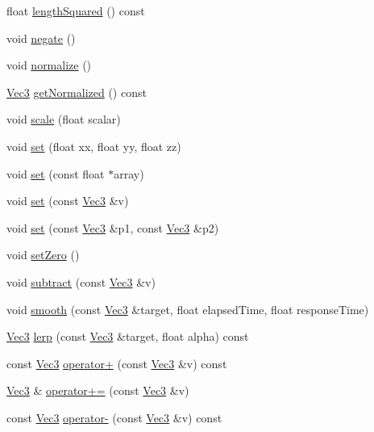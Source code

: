 \begin{DoxyCompactItemize}
\item 
float \hyperlink{classVec3_a31d057d72313ad255d61fb684a37c24f}{length\+Squared} () const
\item 
void \hyperlink{classVec3_aa770b4935cd7d13e1f2571b326e98ac9}{negate} ()
\item 
void \hyperlink{classVec3_a3a6631559d1d36eaf34ca586ce86ede1}{normalize} ()
\item 
\hyperlink{classVec3}{Vec3} \hyperlink{classVec3_aed345a2ae8ac7a2a76aecf07cec2e0af}{get\+Normalized} () const
\item 
void \hyperlink{classVec3_a62541bd2e79923b7da500bfabeb54b4a}{scale} (float scalar)
\item 
void \hyperlink{classVec3_a75e9107e6297aa63a385f6ff3c17742b}{set} (float xx, float yy, float zz)
\item 
void \hyperlink{classVec3_a61237d7bfe731bd96235a3fe7aeaf6e7}{set} (const float $\ast$array)
\item 
void \hyperlink{classVec3_ab3975270b5f296c9397d51c90765e80e}{set} (const \hyperlink{classVec3}{Vec3} \&v)
\item 
void \hyperlink{classVec3_af3cde4c257ab262d2f86c67a5ff0603b}{set} (const \hyperlink{classVec3}{Vec3} \&p1, const \hyperlink{classVec3}{Vec3} \&p2)
\item 
void \hyperlink{classVec3_a8b09dd643a87bc559ebf6aacb73b7f96}{set\+Zero} ()
\item 
void \hyperlink{classVec3_a7c31a8cd8647e4be1e5c82a5f29d7355}{subtract} (const \hyperlink{classVec3}{Vec3} \&v)
\item 
void \hyperlink{classVec3_a7444b42534c1b629782dd5b1bbb0ca16}{smooth} (const \hyperlink{classVec3}{Vec3} \&target, float elapsed\+Time, float response\+Time)
\item 
\hyperlink{classVec3}{Vec3} \hyperlink{classVec3_a1e1f3d58cfbb3083f263000500f76a57}{lerp} (const \hyperlink{classVec3}{Vec3} \&target, float alpha) const
\item 
const \hyperlink{classVec3}{Vec3} \hyperlink{classVec3_afc46ae6022e89d29fe5456cab636d804}{operator+} (const \hyperlink{classVec3}{Vec3} \&v) const
\item 
\hyperlink{classVec3}{Vec3} \& \hyperlink{classVec3_a10e2ed1968402a31090cba6fe8f9250a}{operator+=} (const \hyperlink{classVec3}{Vec3} \&v)
\item 
const \hyperlink{classVec3}{Vec3} \hyperlink{classVec3_ab16ba241e199e6604928cd5ae66e37d4}{operator-\/} (const \hyperlink{classVec3}{Vec3} \&v) const
\item 

\end{DoxyCompactItemize}
